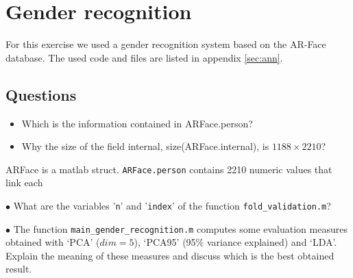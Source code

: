 \section{Gender recognition}

For this exercise we used a gender recognition system based on the AR-Face database. The used code and files are listed in appendix \ref{sec:ann}.

\subsection{Questions}

\question

\begin{itemize}
	\item Which is the information contained in ARFace.person?
	\item Why the size of the field internal, size(ARFace.internal), is $ 1188 \times 2210 $?
\end{itemize}

ARFace is a matlab struct. \texttt{ARFace.person} contains 2210 numeric values that link each 


\question

$ \bullet $ What are the variables '\texttt{n}' and '\texttt{index}' of the function \texttt{fold\_validation.m}?

\question

$ \bullet $ The function \texttt{main\_gender\_recognition.m} computes some evaluation measures obtained with `PCA'
($ dim= 5 $), `PCA95' (95\% variance explained) and `LDA'. Explain the meaning of these measures and discuss which is the best obtained result.